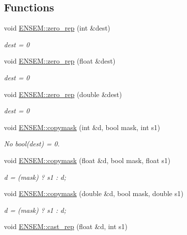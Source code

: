 \subsection*{Functions}
\begin{DoxyCompactItemize}
\item 
void \mbox{\hyperlink{group__simpleword_ga7c61b338c433315893ce5f76f722f66a}{E\+N\+S\+E\+M\+::zero\+\_\+rep}} (int \&dest)
\begin{DoxyCompactList}\small\item\em dest = 0 \end{DoxyCompactList}\item 
void \mbox{\hyperlink{group__simpleword_ga1f2afd419d94a7dc847ef1caee72fea4}{E\+N\+S\+E\+M\+::zero\+\_\+rep}} (float \&dest)
\begin{DoxyCompactList}\small\item\em dest = 0 \end{DoxyCompactList}\item 
void \mbox{\hyperlink{group__simpleword_gab3b525c306493092ee2a6b0369d8102c}{E\+N\+S\+E\+M\+::zero\+\_\+rep}} (double \&dest)
\begin{DoxyCompactList}\small\item\em dest = 0 \end{DoxyCompactList}\item 
void \mbox{\hyperlink{group__simpleword_gab61b33e199acc41a1defab4556948f0d}{E\+N\+S\+E\+M\+::copymask}} (int \&d, bool mask, int s1)
\begin{DoxyCompactList}\small\item\em No bool(dest) = 0. \end{DoxyCompactList}\item 
void \mbox{\hyperlink{group__simpleword_ga048f9b334cb6423a697842f7f13b5db2}{E\+N\+S\+E\+M\+::copymask}} (float \&d, bool mask, float s1)
\begin{DoxyCompactList}\small\item\em d = (mask) ? s1 \+: d; \end{DoxyCompactList}\item 
void \mbox{\hyperlink{group__simpleword_gaa25c2164622e826d4beb49ebe0c1f996}{E\+N\+S\+E\+M\+::copymask}} (double \&d, bool mask, double s1)
\begin{DoxyCompactList}\small\item\em d = (mask) ? s1 \+: d; \end{DoxyCompactList}\item 
void \mbox{\hyperlink{group__simpleword_gabc2c653f0d7a689e3a07dd2cd911dee3}{E\+N\+S\+E\+M\+::cast\+\_\+rep}} (float \&d, int s1)

\end{DoxyCompactItemize}
